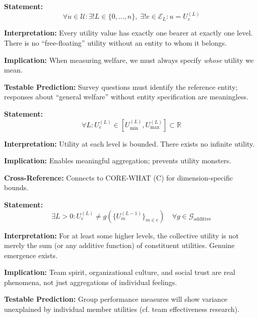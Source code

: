 \begin{tcolorbox}[colback=gray!5!white, colframe=gray!75!black,
    title=Axiom SRL-1: Existence of Utility Bearer]
\textbf{Statement:}
\begin{equation}
\forall u \in \mathcal{U}: \exists! L \in \{0, \ldots, n\}, \; \exists! e \in \mathcal{E}_L: u = U_e^{(L)}
\end{equation}

\textbf{Interpretation:} Every utility value has exactly one bearer at exactly one level.
There is no ``free-floating'' utility without an entity to whom it belongs.

\textbf{Implication:} When measuring welfare, we must always specify \textit{whose} utility we mean.

\textbf{Testable Prediction:} Survey questions must identify the reference entity;
responses about ``general welfare'' without entity specification are meaningless.
\end{tcolorbox}

\begin{tcolorbox}[colback=gray!5!white, colframe=gray!75!black,
    title=Axiom SRL-2: Level Boundedness]
\textbf{Statement:}
\begin{equation}
\forall L: U_e^{(L)} \in [U_{\min}^{(L)}, U_{\max}^{(L)}] \subset \mathbb{R}
\end{equation}

\textbf{Interpretation:} Utility at each level is bounded. There exists no infinite utility.

\textbf{Implication:} Enables meaningful aggregation; prevents utility monsters.

\textbf{Cross-Reference:} Connects to CORE-WHAT (C) for dimension-specific bounds.
\end{tcolorbox}

\begin{tcolorbox}[colback=gray!5!white, colframe=gray!75!black,
    title=Axiom SRL-3: Non-Trivial Emergence]
\textbf{Statement:}
\begin{equation}
\exists L > 0: U_e^{(L)} \neq g\left(\{U_m^{(L-1)}\}_{m \in e}\right) \quad \forall g \in \mathcal{G}_{\text{additive}}
\end{equation}

\textbf{Interpretation:} For at least some higher levels, the collective utility is not merely
the sum (or any additive function) of constituent utilities. Genuine emergence exists.

\textbf{Implication:} Team spirit, organizational culture, and social trust are real phenomena,
not just aggregations of individual feelings.

\textbf{Testable Prediction:} Group performance measures will show variance unexplained
by individual member utilities (cf. team effectiveness research).
\end{tcolorbox}

